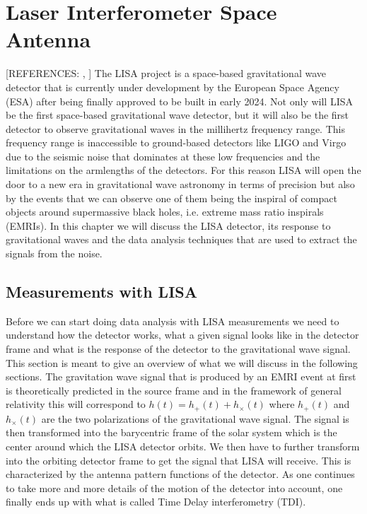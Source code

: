 \chapter{Laser Interferometer Space Antenna}\label{chap:lisa}
 [REFERENCES: \cite{babak2021lisasensitivitysnrcalculations}, \cite{PhysRevD.95.103012}]
The LISA project is a space-based gravitational wave detector that is currently under development by the European Space Agency (ESA) after being finally approved to be built in early 2024. Not only will LISA be the first space-based gravitational wave detector, but it will also be the first detector to observe gravitational waves in the millihertz frequency range. This frequency range is inaccessible to ground-based detectors like LIGO and Virgo due to the seismic noise that dominates at these low frequencies and the limitations on the armlengths of the detectors. For this reason LISA will open the door to a new era in gravitational wave astronomy in terms of precision but also by the events that we can observe one of them being the inspiral of compact objects around supermassive black holes, i.e. extreme mass ratio inspirals (EMRIs). In this chapter we will discuss the LISA detector, its response to gravitational waves and the data analysis techniques that are used to extract the signals from the noise.

\section{Measurements with LISA}
Before we can start doing data analysis with LISA measurements we need to understand how the detector works, what a given signal looks like in the detector frame and what is the response of the detector to the gravitational wave signal. This section is meant to give an overview of what we will discuss in the following sections. The gravitation wave signal that is produced by an EMRI event at first is theoretically predicted in the source frame and in the framework of general relativity this will correspond to $h(t) = h_+(t) + h_\times(t)$ where $h_+(t)$ and $h_\times(t)$ are the two polarizations of the gravitational wave signal. The signal is then transformed into the barycentric frame of the solar system which is the center around which the LISA detector orbits. We then have to further transform into the orbiting detector frame to get the signal that LISA will receive. This is characterized by the antenna pattern functions of the detector. As one continues to take more and more details of the motion of the detector into account, one finally ends up with what is called Time Delay interferometry (TDI).

